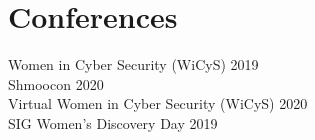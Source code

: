 \documentclass[]{deedy-resume-openfont}
\begin{document}
\begin{minipage}[t]{0.33\textwidth}

\section{Conferences}

\textbullet{} Women in Cyber Security (WiCyS) 2019 \\
\textbullet{} Shmoocon 2020 \\
\textbullet{} Virtual Women in Cyber Security (WiCyS) 2020 \\
\textbullet{} SIG Women's Discovery Day 2019

%
%

\end{minipage} 
\hfill
\end{document}
